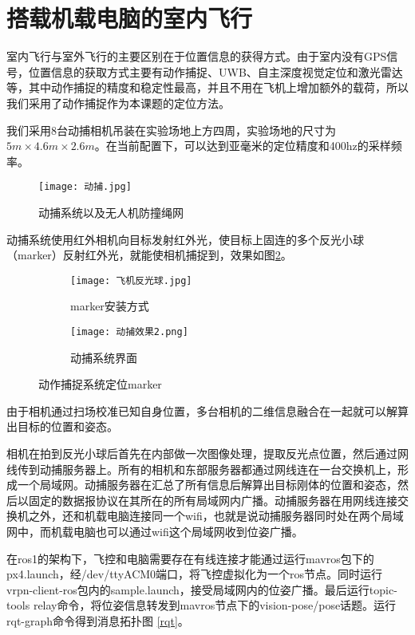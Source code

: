   \section{搭载机载电脑的室内飞行}
室内飞行与室外飞行的主要区别在于位置信息的获得方式。由于室内没有GPS信号，位置信息的获取方式主要有动作捕捉、UWB、自主深度视觉定位和激光雷达等，其中动作捕捉的精度和稳定性最高，并且不用在飞机上增加额外的载荷，所以我们采用了动作捕捉作为本课题的定位方法。

我们采用8台动捕相机吊装在实验场地上方四周，实验场地的尺寸为$5m \times 4.6m \times 2.6m$。在当前配置下，可以达到亚毫米的定位精度和400hz的采样频率\cite{qingtong}。
\begin{figure}[!h]
  \centering
  \texttt{[image: 动捕.jpg]}
  \caption{动捕系统以及无人机防撞绳网}
  \label{动捕}
\end{figure}

动捕系统使用红外相机向目标发射红外光，使目标上固连的多个反光小球（marker）反射红外光，就能使相机捕捉到，效果如图\ref{反光小球}。

\newpage

\begin{figure}[h]
  \centering
  \begin{subfigure}[c]{0.48\textwidth}
    \centering
    \texttt{[image: 飞机反光球.jpg]}
    \caption{marker安装方式}
  \end{subfigure}\hfill
    \begin{subfigure}[c]{0.48\textwidth}
      \centering
      \texttt{[image: 动捕效果2.png]}
      \caption{动捕系统界面}
  \end{subfigure}
  \caption{动作捕捉系统定位marker}
  \label{反光小球}
  \end{figure}


由于相机通过扫场校准已知自身位置，多台相机的二维信息融合在一起就可以解算出目标的位置和姿态。

相机在拍到反光小球后首先在内部做一次图像处理，提取反光点位置，然后通过网线传到动捕服务器上。所有的相机和东部服务器都通过网线连在一台交换机上，形成一个局域网。动捕服务器在汇总了所有信息后解算出目标刚体的位置和姿态，然后以固定的数据报协议在其所在的所有局域网内广播。动捕服务器在用网线连接交换机之外，还和机载电脑连接同一个wifi，也就是说动捕服务器同时处在两个局域网中，而机载电脑也可以通过wifi这个局域网收到位姿广播。

在ros1的架构下，飞控和电脑需要存在有线连接才能通过运行mavros包下的px4.launch，经/dev/ttyACM0端口，将飞控虚拟化为一个ros节点。同时运行vrpn-client-ros包内的sample.launch，接受局域网内的位姿广播。最后运行topic-tools relay命令，将位姿信息转发到mavros节点下的vision-pose/pose话题。运行rqt-graph命令得到消息拓扑图 \ref{rqt}。

